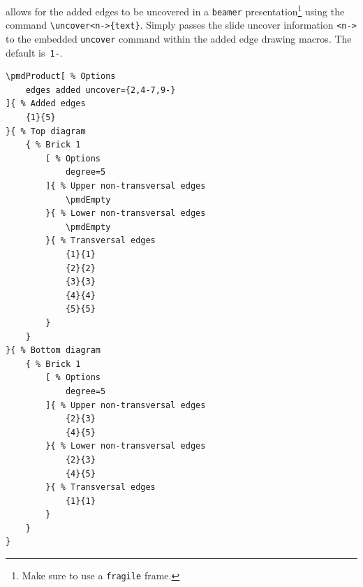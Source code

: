 \documentclass{ltxdoc}
\begin{document}
allows for the added edges to be uncovered in a \texttt{beamer} presentation\footnote{Make sure to use a \texttt{fragile} frame.} using the command \verb`\uncover<n->{text}`. Simply passes the slide uncover information \verb`<n->` to the embedded \texttt{uncover} command within the added edge drawing macros. The default is~\texttt{1-}.
\begin{center}
    \begin{minipage}{\dimexpr0.85\textwidth-2\fboxrule-2\fboxsep\relax}
        \begin{minipage}[c]{0.4\linewidth}
\begin{verbatim}
\pmdProduct[ % Options
    edges added uncover={2,4-7,9-}
]{ % Added edges
    {1}{5}
}{ % Top diagram
    { % Brick 1
        [ % Options
            degree=5
        ]{ % Upper non-transversal edges
            \pmdEmpty
        }{ % Lower non-transversal edges
            \pmdEmpty
        }{ % Transversal edges
            {1}{1}
            {2}{2}
            {3}{3}
            {4}{4}
            {5}{5}
        }
    }
}{ % Bottom diagram
    { % Brick 1
        [ % Options
            degree=5
        ]{ % Upper non-transversal edges
            {2}{3}
            {4}{5}
        }{ % Lower non-transversal edges
            {2}{3}
            {4}{5}
        }{ % Transversal edges
            {1}{1}
        }
    }
}
\end{verbatim}
        \end{minipage}
        \hfill
        \begin{minipage}[c]{0.4\linewidth}
        \end{minipage}
    \end{minipage}%
\end{center}
\begin{center}
\end{center}
\end{document}
